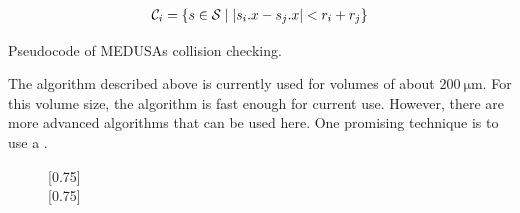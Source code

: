 \begin{align}
\begin{split}
\mathcal{C}_i = \{ s \in \mathcal{S} \mid \lvert s_i.x - s_j.x\rvert < r_i+r_j \}
\end{split}
\end{align}
%
\begin{lstfloat}[!t]
	
	\caption{Pseudocode of \acs{MEDUSA}s collision checking.}
	\label{alg:medusa_collision}
\end{lstfloat}
%
The algorithm described above is currently used for volumes of about $\SI{200}{\micro\meter}$.
For this volume size, the algorithm is fast enough for current use.
However, there are more advanced algorithms that can be used here.
One promising technique is to use a  \cite{Karras2012}.
%
\begin{figure}[!t]
    \centering
    \subcaptionbox{\dummy{}}[0.75\textwidth]{\label{fig:medusa_8a}
    }
    \\[2em]
    \subcaptionbox{\dummy{}}[0.75\textwidth]{\label{fig:medusa_8b}
    }
	\caption{\cite{Ginsburger2019}}
	\label{fig:medusa_8}
\end{figure}
% 
